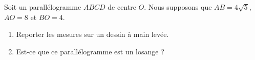 
\begin{exercice}\label{exosmath-0124}

    Soit un parallélogramme \( ABCD\) de centre \( O\). Nous supposons que \( AB=4\sqrt{5}\), \( AO=8\) et \( BO=4\).
    \begin{enumerate}
        \item
            Reporter les mesures sur un dessin à main levée.
        \item
            Est-ce que ce parallélogramme est un losange ?
    \end{enumerate}

\end{exercice}
